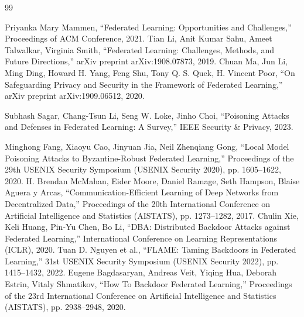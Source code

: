 \documentclass[a4j, twocolumn, dvipdfmx]{jsarticle}  %
\begin{document}
\begin{thebibliography}{99}

Priyanka Mary Mammen,
``Federated Learning: Opportunities and Challenges,''
Proceedings of ACM Conference,
2021.
Tian Li,
Anit Kumar Sahu,
Ameet Talwalkar,
Virginia Smith,
``Federated Learning: Challenges, Methods, and Future Directions,''
arXiv preprint arXiv:1908.07873,
2019.
Chuan Ma,
Jun Li,
Ming Ding,
Howard H. Yang,
Feng Shu,
Tony Q. S. Quek,
H. Vincent Poor,
``On Safeguarding Privacy and Security in the Framework of Federated Learning,''
arXiv preprint arXiv:1909.06512,
2020.

Subhash Sagar,
Chang-Tsun Li,
Seng W. Loke,
Jinho Choi,
``Poisoning Attacks and Defenses in Federated Learning: A Survey,''
IEEE Security \& Privacy,
2023.

Minghong Fang,
Xiaoyu Cao,
Jinyuan Jia,
Neil Zhenqiang Gong,
``Local Model Poisoning Attacks to Byzantine-Robust Federated Learning,''
Proceedings of the 29th USENIX Security Symposium (USENIX Security 2020),
pp. 1605--1622,
2020.
H. Brendan McMahan,
Eider Moore,
Daniel Ramage,
Seth Hampson,
Blaise Aguera y Arcas,
``Communication-Efficient Learning of Deep Networks from Decentralized Data,''
Proceedings of the 20th International Conference on Artificial Intelligence and Statistics (AISTATS),
pp. 1273--1282,
2017.
Chulin Xie,
Keli Huang,
Pin-Yu Chen,
Bo Li,
``DBA: Distributed Backdoor Attacks against Federated Learning,''
International Conference on Learning Representations (ICLR),
2020.
Tuan D. Nguyen et al.,
``FLAME: Taming Backdoors in Federated Learning,''
31st USENIX Security Symposium (USENIX Security 2022),
pp. 1415--1432,
2022.
Eugene Bagdasaryan,
Andreas Veit,
Yiqing Hua,
Deborah Estrin,
Vitaly Shmatikov,
``How To Backdoor Federated Learning,''
Proceedings of the 23rd International Conference on Artificial Intelligence and Statistics (AISTATS),
pp. 2938--2948,
2020.
\end{thebibliography}
\end{document}
